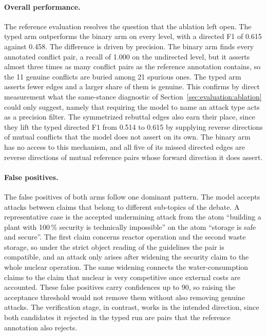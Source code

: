 \paragraph{Overall performance.}
The reference evaluation resolves the question that the ablation left open. The typed
arm outperforms the binary arm on every level, with a directed F1 of 0.615
against 0.458. The difference is driven by precision. The binary arm finds
every annotated conflict pair, a recall of 1.000 on the undirected level, but it
asserts almost three times as many conflict pairs as the reference annotation
contains, so the 11 genuine conflicts are buried among 21 spurious ones. The
typed arm asserts fewer edges and a larger share of them is genuine. This
confirms by direct measurement what the same-stance diagnostic of
Section~\ref{sec:evaluation:ablation} could only suggest, namely that requiring
the model to name an attack type acts as a precision filter. The symmetrized
rebuttal edges also earn their place, since they lift the typed directed F1
from 0.514 to 0.615 by supplying reverse directions of mutual conflicts that
the model does not assert on its own. The binary arm has no access to this
mechanism, and all five of its missed directed edges are reverse directions
of mutual reference pairs whose forward direction it does assert.

\paragraph{False positives.}
The false positives of both arms follow one dominant pattern. The model
accepts attacks between claims that belong to different sub-topics of the
debate. A
representative case is the accepted undermining attack from the atom
``building a plant with 100\,\% security is technically impossible'' on the
atom ``storage is safe and secure''. The first claim concerns reactor
operation and the second waste storage, so under the strict object reading of
the guidelines the pair is compatible, and an attack only arises after
widening the security claim to the whole nuclear operation. The same widening
connects the water-consumption claims to the claim that nuclear is very
competitive once external costs are accounted. These false positives carry
confidences up to 90, so raising the acceptance threshold would not remove
them without also removing genuine attacks. The verification stage, in
contrast, works in the intended direction, since both candidates it rejected
in the typed run are pairs that the reference annotation also rejects.

